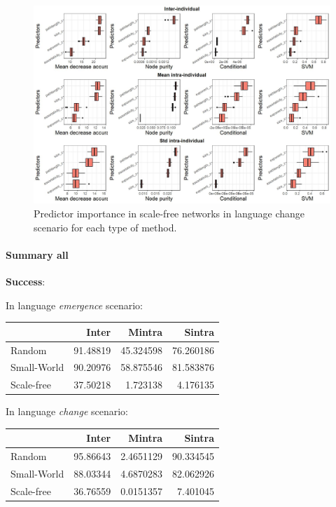 \documentclass[
]{article}
\begin{document}
\begin{figure}[!H]

{\centering \includegraphics{./Figures/unnamed-chunk-110-1} 

}

\caption{Predictor importance in scale-free networks in language change scenario for each type of method.}\label{fig:unnamed-chunk-110}
\end{figure}

\hypertarget{summary-all}{%
\paragraph{Summary all}\label{summary-all}}

\textbf{Success}:

In language \emph{emergence} scenario:

\begin{longtable}[]{@{}lrrr@{}}
\toprule()
& Inter & Mintra & Sintra \\
\midrule()
\endhead
Random & 91.48819 & 45.324598 & 76.260186 \\
Small-World & 90.20976 & 58.875546 & 81.583876 \\
Scale-free & 37.50218 & 1.723138 & 4.176135 \\
\bottomrule()
\end{longtable}

In language \emph{change} scenario:

\begin{longtable}[]{@{}lrrr@{}}
\toprule()
& Inter & Mintra & Sintra \\
\midrule()
\endhead
Random & 95.86643 & 2.4651129 & 90.334545 \\
Small-World & 88.03344 & 4.6870283 & 82.062926 \\
Scale-free & 36.76559 & 0.0151357 & 7.401045 \\
\bottomrule()
\end{longtable}
\end{document}
